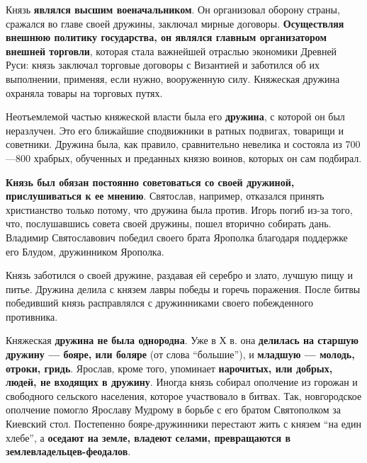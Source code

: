 \documentclass{article}
\begin{document}
Князь \textbf{являлся высшим военачальником}. Он организовал оборону страны, сражался во главе своей дружины, заключал мирные договоры. \textbf{Осуществляя внешнюю политику государства, он являлся главным организатором внешней торговли}, которая стала важнейшей отраслью экономики Древней Руси: князь заключал торговые договоры с Византией и заботился об их выполнении, применяя, если нужно, вооруженную силу. Княжеская дружина охраняла товары на торговых путях.

\hfill

Неотъемлемой частью княжеской власти была его \textbf{дружина}, с которой он был неразлучен. Это его ближайшие сподвижники в ратных подвигах, товарищи и советники. Дружина была, как правило, сравнительно невелика и состояла из 700—800 храбрых, обученных и преданных князю воинов, которых он сам подбирал.

\textbf{Князь был обязан постоянно советоваться со своей дружиной, прислушиваться к ее мнению}. Святослав, например, отказался принять христианство только потому, что дружина была против. Игорь погиб из-за того, что, послушавшись совета своей дружины, пошел вторично собирать дань. Владимир Святославович победил своего брата Ярополка благодаря поддержке его Блудом, дружинником Ярополка.

Князь заботился о своей дружине, раздавая ей серебро и злато, лучшую пищу и питье. Дружина делила с князем лавры победы и горечь поражения. После битвы победивший князь расправлялся с дружинниками своего побежденного противника.

\hfill

Княжеская \textbf{дружина не была однородна}. Уже в Х в. она \textbf{делилась на старшую дружину — бояре, или боляре} (от слова “большие”), и \textbf{младшую — молодь, отроки, гридь}. Ярослав, кроме того, упоминает \textbf{нарочитых, или добрых, людей, не входящих в дружину}. Иногда князь собирал ополчение из горожан и свободного сельского населения, которое участвовало в битвах. Так, новгородское ополчение помогло Ярославу Мудрому в борьбе с его братом Святополком за Киевский стол. Постепенно бояре-дружинники перестают жить с князем “на един хлебе”, а \textbf{оседают на земле, владеют селами, превращаются в землевладельцев-феодалов}.

\hfill
\end{document}

